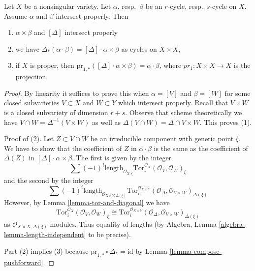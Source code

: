 \begin{lemma}
\label{lemma-reduction-diagonal}
Let $X$ be a nonsingular variety. Let $\alpha$, resp.\ $\beta$
be an $r$-cycle, resp.\ $s$-cycle on $X$. Assume $\alpha$ and $\beta$
intersect properly. Then
\begin{enumerate}
\item $\alpha \times \beta$ and $[\Delta]$ intersect properly
\item we have $\Delta_*(\alpha \cdot \beta) = [\Delta] \cdot \alpha\times\beta$
as cycles on $X \times X$,
\item if $X$ is proper, then
$\text{pr}_{1, *}([\Delta] \cdot \alpha\times\beta) = \alpha\cdot\beta$,
where $pr_1 : X\times X \to X$ is the projection.
\end{enumerate}
\end{lemma}

\begin{proof}
By linearity it suffices to prove this when $\alpha = [V]$ and $\beta = [W]$
for some closed subvarieties $V \subset X$ and $W \subset Y$ which intersect
properly. Recall that $V \times W$ is a closed subvariety of dimension $r + s$.
Observe that scheme theoretically we have
$V \cap W = \Delta^{-1}(V \times W)$ as well as
$\Delta(V \cap W) = \Delta \cap V \times W$.
This proves (1).

\medskip\noindent
Proof of (2). Let $Z \subset V \cap W$ be an irreducible component
with generic point $\xi$. We have to show that the coefficient of
$Z$ in $\alpha \cdot \beta$ is the same as the coefficient of
$\Delta(Z)$ in $[\Delta] \cdot \alpha \times \beta$. The first is given
by the integer
$$
\sum (-1)^i
\text{length}_{\mathcal{O}_{X, \xi}}
\text{Tor}_i^{\mathcal{O}_X}(\mathcal{O}_V, \mathcal{O}_W)_\xi
$$
and the second by the integer
$$
\sum (-1)^i
\text{length}_{\mathcal{O}_{X \times Y, \Delta(\xi)}}
\text{Tor}_i^{\mathcal{O}_{X \times Y}}(
\mathcal{O}_\Delta, \mathcal{O}_{V \times W})_{\Delta(\xi)}
$$
However, by Lemma \ref{lemma-tor-and-diagonal} we have
$$
\text{Tor}_i^{\mathcal{O}_X}(\mathcal{O}_V, \mathcal{O}_W)_\xi \cong
\text{Tor}_i^{\mathcal{O}_{X \times Y}}(
\mathcal{O}_\Delta, \mathcal{O}_{V \times W})_{\Delta(\xi)}
$$
as $\mathcal{O}_{X \times X, \Delta(\xi)}$-modules. Thus equality
of lengths (by Algebra, Lemma \ref{algebra-lemma-length-independent}
to be precise).

\medskip\noindent
Part (2) implies (3) because
$\text{pr}_{1, *} \circ \Delta_* = \text{id}$ by
Lemma \ref{lemma-compose-pushforward}.
\end{proof}

